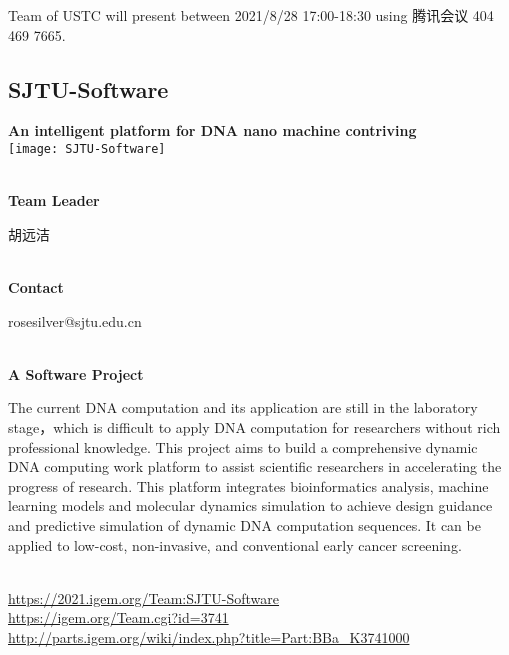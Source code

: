 \vfill{}









Team of USTC will present between        2021/8/28 17:00-18:30 using 腾讯会议 404 469 7665.
\newpage


\subsection{\textcolor{Blu}{ SJTU-Software } }
\vspace{5mm}
\begin{center}
\large{
  \textbf{ An intelligent platform for DNA nano machine contriving }\\
  \texttt{[image: SJTU-Software]}
}
\end{center}
\textbf{\\Team Leader}

  胡远洁


\textbf{\\Contact}

  rosesilver@sjtu.edu.cn


\textbf{\\A Software Project\\}\begin{spacing}{1.5}

The current DNA computation and its application are still in the laboratory stage，which is difficult to apply DNA computation for researchers without rich professional knowledge. This project aims to build a comprehensive dynamic DNA computing work platform to assist scientific researchers in accelerating the progress of research. This platform integrates bioinformatics analysis, machine learning models and molecular dynamics simulation to achieve design guidance and predictive simulation of dynamic DNA computation sequences. It can be applied to low-cost, non-invasive, and conventional early cancer screening.\end{spacing}
\\

\url{https://2021.igem.org/Team:SJTU-Software }\\
\url{https://igem.org/Team.cgi?id=3741 }\\
\url{http://parts.igem.org/wiki/index.php?title=Part:BBa_K3741000 }\\


\vfill{}









